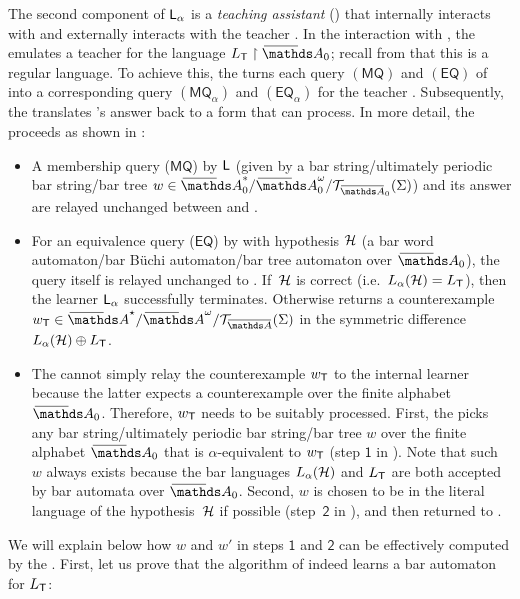 \documentclass[a4paper,UKenglish,cleveref,autoref,thm-restate,numberwithinsect,final]{lipics-v2021}
\begin{document}
The second component of $\textsf{L}_\alpha$ is a \emph{teaching assistant} (\tass) that internally interacts with \learn and externally interacts with the teacher \teach. In the interaction with \learn, the \tass emulates a teacher for the language $L_\teach \restriction \barNames_0$; recall from  that this is a regular language. To achieve this, the \tass turns each query $(\textsf{MQ})$ and $(\textsf{EQ})$ of \learn into a corresponding query $(\textsf{MQ}_\alpha)$ and $(\textsf{EQ}_\alpha)$ for the teacher \teach. Subsequently, the \tass translates \teach's answer back to a form that \learn can process.  
In more detail, the \tass proceeds as shown in :
\begin{itemize}
\item A membership query ($\textsf{MQ}$) by $\textsf{L}$ (given by a bar string/ultimately periodic bar string/bar tree $w\in \barNames_0^*/\barNames_0^\omega/\bartree[\barNamess_0](\Sigma)$) and its answer are relayed
    unchanged between \learn and \teach.
\item For an equivalence query ($\textsf{EQ}$) by \learn with hypothesis $\mathcal{H}$ (a bar word
  automaton/bar Büchi automaton/bar tree automaton over $\barNames_0$), the query itself is
  relayed unchanged to \teach. If~$\mathcal{H}$ is correct (i.e.~$L_\alpha(\mathcal{H})=L_\textsf{T}$), then the learner $\textsf{L}_\alpha$ successfully terminates. Otherwise \teach
    returns a counterexample $w_\teach \in \barAs/\barAw/\bartree(\Sigma)$ in the symmetric difference $L_\alpha(\mathcal{H})\oplus L_\textsf{T}$. 
\item The \tass cannot simply relay the counterexample $w_\textsf{T}$ to the internal learner \learn because the latter expects a counterexample over the finite alphabet $\barNames_0$. Therefore, $w_\textsf{T}$ needs to be suitably processed. First, the \tass picks any bar string/ultimately periodic bar string/bar tree $w$ over the finite alphabet $\barNames_0$ that is $\alpha$-equivalent to $w_\textsf{T}$ (step $\mathsf{1}$ in ). Note that such $w$ always exists because the bar languages $L_\alpha(\mathcal{H})$ and $L_\textsf{T}$ are both accepted by bar automata over $\barNames_0$. Second, $w$ is chosen to be in the literal language of the hypothesis~$\mathcal{H}$ if possible (step~$\mathsf{2}$ in ), and then returned to \learn. 
\end{itemize}

We will explain below how $w$ and $w'$ in steps $\mathsf{1}$ and $\mathsf{2}$ can be
effectively computed by the \tass. First, let us prove that the algorithm of  indeed learns a bar automaton for $L_\textsf{T}$:
    
\end{document}
